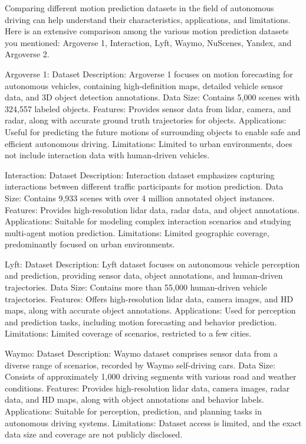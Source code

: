 Comparing different motion prediction datasets in the field of autonomous driving can help understand their characteristics, applications, and limitations. Here is an extensive comparison among the various motion prediction datasets you mentioned: Argoverse 1, Interaction, Lyft, Waymo, NuScenes, Yandex, and Argoverse 2.

Argoverse 1:
Dataset Description: Argoverse 1 focuses on motion forecasting for autonomous vehicles, containing high-definition maps, detailed vehicle sensor data, and 3D object detection annotations.
Data Size: Contains 5,000 scenes with 324,557 labeled objects.
Features: Provides sensor data from lidar, camera, and radar, along with accurate ground truth trajectories for objects.
Applications: Useful for predicting the future motions of surrounding objects to enable safe and efficient autonomous driving.
Limitations: Limited to urban environments, does not include interaction data with human-driven vehicles.

Interaction:
Dataset Description: Interaction dataset emphasizes capturing interactions between different traffic participants for motion prediction.
Data Size: Contains 9,933 scenes with over 4 million annotated object instances.
Features: Provides high-resolution lidar data, radar data, and object annotations.
Applications: Suitable for modeling complex interaction scenarios and studying multi-agent motion prediction.
Limitations: Limited geographic coverage, predominantly focused on urban environments.

Lyft:
Dataset Description: Lyft dataset focuses on autonomous vehicle perception and prediction, providing sensor data, object annotations, and human-driven trajectories.
Data Size: Contains more than 55,000 human-driven vehicle trajectories.
Features: Offers high-resolution lidar data, camera images, and HD maps, along with accurate object annotations.
Applications: Used for perception and prediction tasks, including motion forecasting and behavior prediction.
Limitations: Limited coverage of scenarios, restricted to a few cities.

Waymo:
Dataset Description: Waymo dataset comprises sensor data from a diverse range of scenarios, recorded by Waymo self-driving cars.
Data Size: Consists of approximately 1,000 driving segments with various road and weather conditions.
Features: Provides high-resolution lidar data, camera images, radar data, and HD maps, along with object annotations and behavior labels.
Applications: Suitable for perception, prediction, and planning tasks in autonomous driving systems.
Limitations: Dataset access is limited, and the exact data size and coverage are not publicly disclosed.

